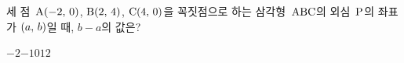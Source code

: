 세 점~$\mathrm{A}(-2,\mkern3mu 0)$, $\mathrm{B}(2,\mkern3mu 4)$, $\mathrm{C}(4,\mkern3mu 0)$을 꼭짓점으로 하는 삼각형~$\mathrm{ABC}$의 외심~$\mathrm{P}$의 좌표가 $(a,\mkern3mu b)$일 때, $b-a$의 값은?
\begin{choices32}{$-2$}{$-1$}{$0$}{$1$}{$2$}\end{choices32}
